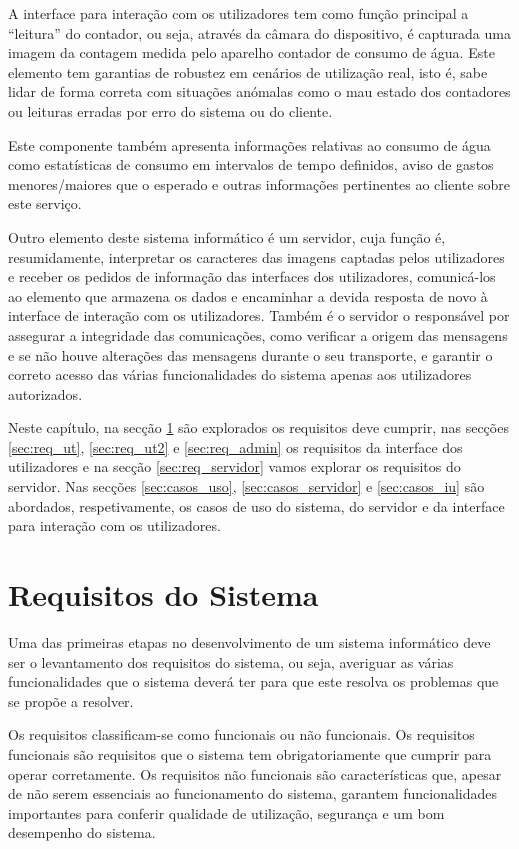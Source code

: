 A interface para interação com os utilizadores tem como função principal a “leitura” do contador, ou seja, através da câmara do dispositivo, é capturada uma imagem da contagem medida pelo aparelho contador de consumo de água. Este elemento tem garantias de robustez em cenários de utilização real, isto é, sabe lidar de forma correta com situações anómalas como o mau estado dos contadores ou leituras erradas por erro do sistema ou do cliente.\par
Este componente também apresenta informações relativas ao consumo de água como estatísticas de consumo em intervalos de tempo definidos, aviso de gastos menores/maiores que o esperado e outras informações pertinentes ao cliente sobre este serviço.\par
Outro elemento deste sistema informático é um servidor, cuja função é, resumidamente, interpretar os caracteres das imagens captadas pelos utilizadores e receber os pedidos de informação das interfaces dos utilizadores, comunicá-los ao elemento que armazena os dados e encaminhar a devida resposta de novo à interface de interação com os utilizadores. Também é o servidor o responsável por assegurar a integridade das comunicações, como verificar a origem das mensagens e se não houve alterações das mensagens durante o seu transporte, e garantir o correto acesso das várias funcionalidades do sistema apenas aos utilizadores autorizados.\par

Neste capítulo, na secção \ref{sec:req_sis} são explorados os requisitos deve cumprir, nas secções \ref{sec:req_ut}, \ref{sec:req_ut2} e \ref{sec:req_admin} os requisitos da interface dos utilizadores e na secção \ref{sec:req_servidor} vamos explorar os requisitos do servidor. Nas secções \ref{sec:casos_uso}, \ref{sec:casos_servidor} e \ref{sec:casos_iu} são abordados, respetivamente, os casos de uso do sistema, do servidor e da interface para interação com os utilizadores.

\section{Requisitos do Sistema} \label{sec:req_sis}
Uma das primeiras etapas no desenvolvimento de um sistema informático deve ser o levantamento dos requisitos do sistema, ou seja, averiguar as várias funcionalidades que o sistema deverá ter para que este resolva os problemas que se propõe a resolver.\par
Os requisitos classificam-se como funcionais ou não funcionais. Os requisitos funcionais são requisitos que o sistema tem obrigatoriamente que cumprir para operar corretamente. Os requisitos não funcionais são características que, apesar de não serem essenciais ao funcionamento do sistema, garantem funcionalidades importantes para conferir qualidade de utilização, segurança e um bom desempenho do sistema.


